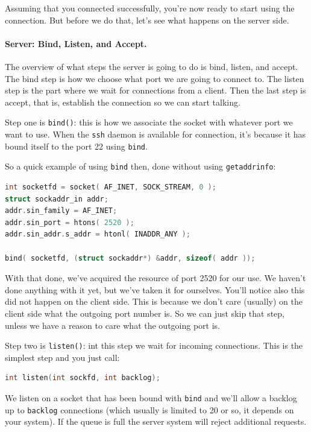 \documentclass[a4paper]{report}
\begin{document}
Assuming that you connected successfully, you're now ready to start using the connection. But before we do that, let's see what happens on the server side.

\paragraph{Server: Bind, Listen, and Accept.}
The overview of what steps the server is going to do is bind, listen, and accept. The bind step is how we choose what port we are going to connect to. The listen step is the part where we wait for connections from a client. Then the last step is accept, that is, establish the connection so we can start talking.

Step one is \texttt{bind()}: this is how we associate the socket with whatever port we want to use. When the \texttt{ssh} daemon is available for connection, it's because it has bound itself to the port 22 using \texttt{bind}.

So a quick example of using \texttt{bind} then, done without using \texttt{getaddrinfo}:

\begin{lstlisting}[language=C]
int socketfd = socket( AF_INET, SOCK_STREAM, 0 );
struct sockaddr_in addr;
addr.sin_family = AF_INET;
addr.sin_port = htons( 2520 );
addr.sin_addr.s_addr = htonl( INADDR_ANY );

bind( socketfd, (struct sockaddr*) &addr, sizeof( addr ));
\end{lstlisting}

With that done, we've acquired the resource of port 2520 for our use. We haven't done anything with it yet, but we've taken it for ourselves. You'll notice also this did not happen on the client side. This is because we don't care (usually) on the client side what the outgoing port number is. So we can just skip that step, unless we have a reason to care what the outgoing port is.

Step two is \texttt{listen()}: int this step we wait for incoming connections. This is the simplest step and you just call:

\begin{lstlisting}[language=C]
int listen(int sockfd, int backlog); 
\end{lstlisting}

We listen on a socket that has been bound with \texttt{bind} and we'll allow a backlog up to \texttt{backlog} connections (which usually is limited to 20 or so, it depends on your system). If the queue is full the server system will reject additional requests.
\end{document}
